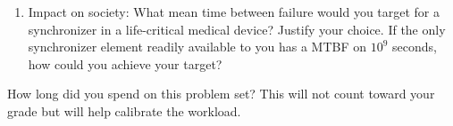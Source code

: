 \documentclass{e85}
\begin{document}
\begin{enumerate}
\item Impact on society: What mean time between failure would you
  target for a synchronizer in a life-critical medical device?
  Justify your choice.  If the only synchronizer element readily
  available to you has a MTBF on \(10^9\) seconds, how could you
  achieve your target?
  \begin{solution}
  \end{solution}
\end{enumerate}

How long did you spend on this problem set?  This will not count
toward your grade but will help calibrate the workload.
\begin{solution}
\end{solution}
\end{document}
